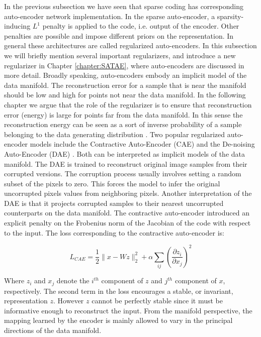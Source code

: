 In the previous subsection we have seen that sparse coding has corresponding
auto-encoder network implementation. In the sparse auto-encoder, a
sparsity-inducing $L^1$ penalty is applied to the code, i.e. output of the
encoder. Other penalties are possible and impose different priors on the
representation. In general these architectures are called regularized
auto-encoders. In this subsection we will briefly mention several important
regularizers, and introduce a new regularizer in Chapter \ref{chapter:SATAE},
where auto-encoders are discussed in more detail. Broadly speaking,
auto-encoders embody an implicit model of the data manifold. The reconstruction
error for a sample that is near the manifold should be low and high for points not
near the data manifold.  In the following chapter we argue that the role of the
regularizer is to ensure that reconstruction error (energy) is large for points
far from the data manifold. In this sense the reconstruction energy can be seen
as a sort of inverse probability of a sample belonging to the data generating
distribution \cite{lecun2006}. Two popular regularized auto-encoder models
include the Contractive Auto-Encoder (CAE) and the De-noising Auto-Encoder
(DAE) \cite{CAE,DAE}. Both can be interpreted as implicit models of the data
manifold. The DAE is trained to reconstruct original image samples from their 
corrupted versions. The corruption process usually involves setting a random subset 
of the pixels to zero. This forces the model to infer the original uncorrupted pixels 
values from neighboring pixels. Another interpretation of the DAE is that it projects 
corrupted samples to their nearest uncorrupted counterparts on the data manifold. The
contractive auto-encoder introduced an explicit penalty on the Frobenius 
norm of the Jacobian of the code with respect to the input. The loss corresponding 
to the contractive auto-encoder is: 

\begin{equation} 
\nonumber 
L_{CAE} = \frac{1}{2} \|x - Wz \|_2 ^ 2 + \alpha \sum_{ij} \left(\frac{\partial z_i}{\partial x_j}\right)^2  
\end{equation}  

Where $z_i$ and $x_j$ denote the $i^{th}$ component of $z$ and $j^{th}$
component of $x$, respectively.  The second term in the loss encourages a
stable, or invariant, representation $z$. However $z$ cannot be perfectly
stable since it must be informative enough to reconstruct the input. From the
manifold perspective, the mapping learned by the encoder is mainly allowed to
vary in the principal directions of the data manifold.           


